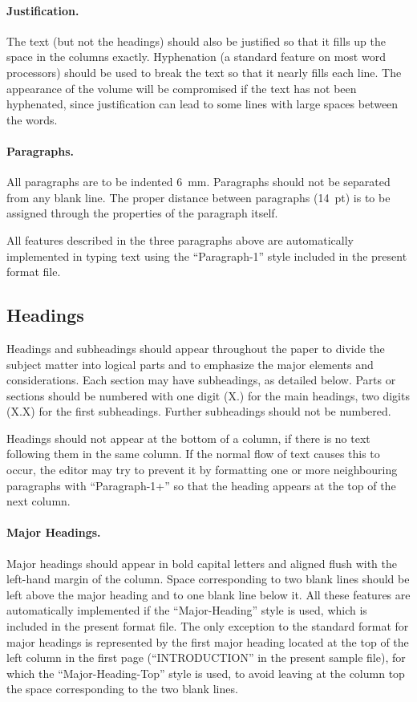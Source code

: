 \documentclass[bibtex,pagenumbers]{stabs2021}
\begin{document}
\paragraph{Justification.}

The text (but not the headings) should also be justified so that it
fills up the space in the columns exactly. Hyphenation (a standard
feature on most word processors) should be used to break the text so
that it nearly fills each line. The appearance of the volume will be
compromised if the text has not been hyphenated, since justification
can lead to some lines with large spaces between the words.

\paragraph{Paragraphs.}

All paragraphs are to be indented 6~mm. Paragraphs should not be
separated from any blank line. The proper distance between paragraphs
(14~pt) is to be assigned through the properties of the paragraph
itself.

All features described in the three paragraphs above are automatically
implemented in typing text using the ``Paragraph-1'' style included in
the present format file.

\subsection{Headings}

Headings and subheadings should appear throughout the paper to divide
the subject matter into logical parts and to emphasize the major
elements and considerations. Each section may have subheadings, as
detailed below. Parts or sections should be numbered with one digit
(X.) for the main headings, two digits (X.X) for the first
subheadings. Further subheadings should not be numbered.

Headings should not appear at the bottom of a column, if there is no
text following them in the same column. If the normal flow of text
causes this to occur, the editor may try to prevent it by formatting
one or more neighbouring paragraphs with ``Paragraph-1+'' so that the
heading appears at the top of the next column.

\paragraph{Major Headings.}

Major headings should appear in bold capital letters and aligned flush
with the left-hand margin of the column. Space corresponding to two
blank lines should be left above the major heading and to one blank
line below it. All these features are automatically implemented if the
``Major-Heading'' style is used, which is included in the present
format file. The only exception to the standard format for major
headings is represented by the first major heading located at the top
of the left column in the first page (``INTRODUCTION'' in the present
sample file), for which the ``Major-Heading-Top'' style is used, to
avoid leaving at the column top the space corresponding to the two
blank lines.
\end{document}
